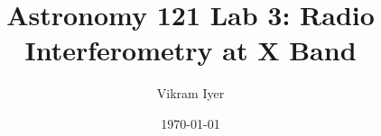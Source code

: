 \documentclass{article}
\title{Astronomy 121 Lab 3: Radio Interferometry at X Band}
\author{Vikram Iyer}
\date{\today}
\begin{document}
\maketitle


\begin{abstract}
\end{abstract}













\end{document}
